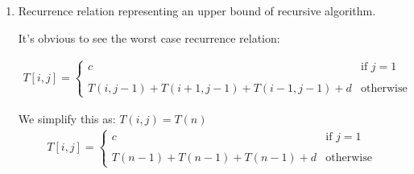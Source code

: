 \documentclass{cpsc413Solutions}
\begin{document}
\begin{problemlist}
\begin{problem}
\begin{problem}
\begin{answer}
\begin{enumerate}
    Recursive algorithm:
    
    \begin{lstlisting}[numbers=left, mathescape=true]
maxValue($i,j$){
    if ($j==1$){  // at the bottom of board
        return 0
    }
    else if ($i==1$){ // at leftmost square of the board
        $dm = p((i,j-1), (i,j))+maxValue(i,j-1)$
        $dr = p((i+1,j-1), (i,j))+maxValue(i+1,j-1)$
        return $\max(dm,dr)$
    }
    else if ($j==n$){ // at rightmost square of the board
        $dm = p((i,j-1), (i,j))+maxValue(i,j-1)$
        $dl = p((i-1,j-1), (i,j))+maxValue(i-1,j-1)$
        return $\max(dm,dl)$
    }
    else{
        $dm = p((i,j-1), (i,j))+maxValue(i,j-1)$
        $dl = p((i-1,j-1), (i,j))+maxValue(i-1,j-1)$
        $dr = p((i+1,j-1), (i,j))+maxValue(i+1,j-1)$
        return $\max(dm,dl,dr)$
    }
}
\end{lstlisting}

The non-recursive driver program:

\begin{lstlisting}[numbers=left, mathescape=true]
driver{
    result = $-\infty$
    for $i=0$ to $n-1$
        result = $\max(result, maxValue(i,n-1))$
    end for
    return result
}
\end{lstlisting}
    
    \newpage
    \item Recurrence relation representing an upper bound of recursive algorithm.
    
    It's obvious to see the worst case recurrence relation:
    
    \begin{align*}
    T[i,j] = 
        \begin{cases}
         c  &\text{if $j=1$}\\
        \\
       T(i,j-1)+T(i+1,j-1)+T(i-1,j-1) + d & \text{otherwise}
        \end{cases}
    \end{align*}
    
    We simplify this as:
    $T(i,j) = T(n)$
    \begin{align*}
    T[i,j] = 
        \begin{cases}
         c  &\text{if $j=1$}\\
        \\
       T(n-1)+T(n-1)+T(n-1) + d & \text{otherwise}
        \end{cases}
    \end{align*}
    

\end{enumerate}
\end{answer}
\end{problem}
\end{problem}
\end{problemlist}
\end{document}
